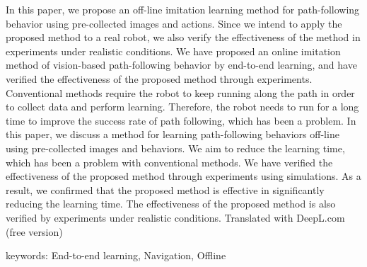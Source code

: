 In this paper, we propose an off-line imitation learning method for path-following behavior using pre-collected images and actions. Since we intend to apply the proposed method to a real robot, we also verify the effectiveness of the method in experiments under realistic conditions. We have proposed an online imitation method of vision-based path-following behavior by end-to-end learning, and have verified the effectiveness of the proposed method through experiments. Conventional methods require the robot to keep running along the path in order to collect data and perform learning. Therefore, the robot needs to run for a long time to improve the success rate of path following, which has been a problem. In this paper, we discuss a method for learning path-following behaviors off-line using pre-collected images and behaviors. We aim to reduce the learning time, which has been a problem with conventional methods. We have verified the effectiveness of the proposed method through experiments using simulations. As a result, we confirmed that the proposed method is effective in significantly reducing the learning time. The effectiveness of the proposed method is also verified by experiments under realistic conditions. Translated with DeepL.com (free version) 

\vspace{10mm}
keywords: End-to-end learning, Navigation, Offline 
